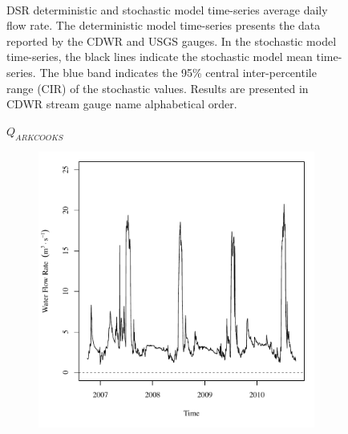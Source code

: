 \begin{linenumbers}
\begin{landscape}
\begin{figure}
\begin{subfigure}{0.7\textwidth}
		\end{subfigure}\\
		\caption[DSR deterministic and stochastic model time-series average daily flow rate.]{DSR deterministic and stochastic model time-series average daily flow rate.  The deterministic model time-series presents the data reported by the CDWR and USGS gauges.  In the stochastic model time-series, the black lines indicate the stochastic model mean time-series.  The blue band indicates the 95\% central inter-percentile range (CIR) of the stochastic values.  Results are presented in CDWR stream gauge name alphabetical order.}
		\label{fig:GaugeFlow_DS}
	\end{figure}
\end{landscape}
\subfiguremid
\begin{landscape}
	\begin{figure}
		\centering
		$ Q_{ARKCOOKS} $
		\begin{subfigure}{0.7\textwidth}
			\centering
			\includegraphics[width=\tableCustomSize]{"Figures/Results_DSR/Deterministic/Q out"}
		\end{subfigure}%
		\begin{subfigure}{0.7\textwidth}
			\centering

\end{subfigure}
\end{figure}
\end{landscape}
\end{linenumbers}
